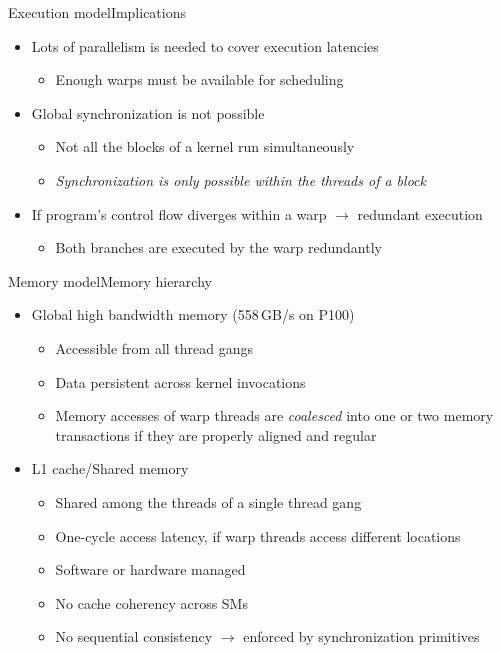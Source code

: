 \documentclass[aspectratio=169,12pt]{beamer}
\begin{document}
\begin{frame}{Execution model}{Implications}
  \begin{itemize}
  \item Lots of parallelism is needed to cover execution latencies
    \begin{itemize}
    \item Enough warps must be available for scheduling
    \end{itemize}
    \vfill
  \item Global synchronization is not possible
    \begin{itemize}
    \item Not all the blocks of a kernel run simultaneously
    \item \emph{Synchronization is only possible within the threads of a block}
    \end{itemize}
    \vfill
  \item If program's control flow diverges within a warp $\rightarrow$ redundant execution
    \begin{itemize}
    \item Both branches are executed by the warp redundantly
    \end{itemize}
  \end{itemize}
\end{frame}


\begin{frame}{Memory model}{Memory hierarchy}
  \begin{itemize}
  \item Global high bandwidth memory (558\,GB/s on P100)
    \begin{itemize}
    \item Accessible from all thread gangs
    \item Data persistent across kernel invocations
    \item Memory accesses of warp threads are \emph{coalesced} into one or two
      memory transactions if they are properly aligned and regular
    \end{itemize}
  \item L1 cache/Shared memory
    \begin{itemize}
    \item Shared among the threads of a single thread gang
    \item One-cycle access latency, if warp threads access different locations
    \item Software or hardware managed
    \item No cache coherency across SMs
    \item No sequential consistency $\rightarrow$ enforced by synchronization primitives
    \end{itemize}
  \end{itemize}
\end{frame}
\end{document}
